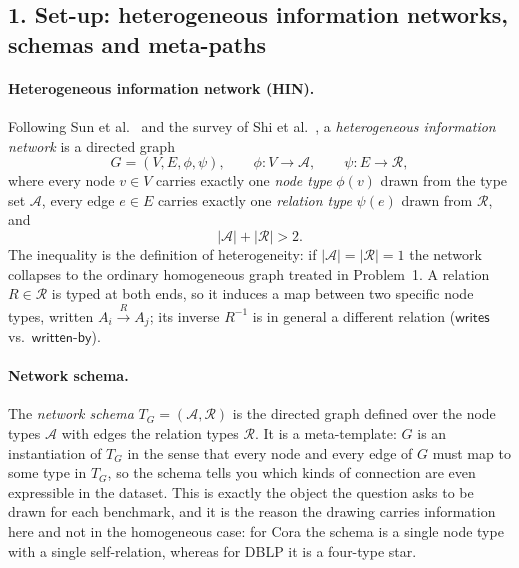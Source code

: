 
\subsection*{1. Set-up: heterogeneous information networks, schemas and meta-paths}

\paragraph{Heterogeneous information network (HIN).}
Following Sun et al.~\cite{p2:pathsim} and the survey of Shi et al.~\cite{p2:hinsurvey}, a
\emph{heterogeneous information network} is a directed graph
\[
  G=(V,E,\phi,\psi),\qquad
  \phi:V\to\mathcal{A},\qquad
  \psi:E\to\mathcal{R},
\]
where every node $v\in V$ carries exactly one \emph{node type} $\phi(v)$ drawn from the type set
$\mathcal{A}$, every edge $e\in E$ carries exactly one \emph{relation type} $\psi(e)$ drawn from
$\mathcal{R}$, and
\[
  |\mathcal{A}|+|\mathcal{R}|>2 .
\]
The inequality is the definition of heterogeneity: if $|\mathcal{A}|=|\mathcal{R}|=1$ the network
collapses to the ordinary homogeneous graph treated in Problem~1. A relation
$R\in\mathcal{R}$ is typed at both ends, so it induces a map between two specific node types,
written $A_i\xrightarrow{R}A_j$; its inverse $R^{-1}$ is in general a different relation
($\textsf{writes}$ vs.\ $\textsf{written-by}$).

\paragraph{Network schema.}
The \emph{network schema} $T_G=(\mathcal{A},\mathcal{R})$ is the directed graph defined over the
node types $\mathcal{A}$ with edges the relation types $\mathcal{R}$. It is a meta-template: $G$ is
an instantiation of $T_G$ in the sense that every node and every edge of $G$ must map to some type
in $T_G$, so the schema tells you which kinds of connection are even expressible in the dataset.
This is exactly the object the question asks to be drawn for each benchmark, and it is the reason
the drawing carries information here and not in the homogeneous case: for Cora the schema is a
single node type with a single self-relation, whereas for DBLP it is a four-type star.

